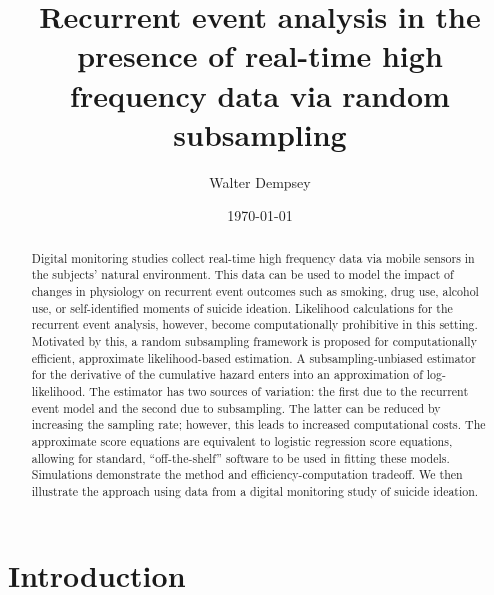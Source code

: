 \documentclass[11pt]{amsart}
\begin{document}
\title{Recurrent event analysis in the presence of real-time high
  frequency data via random subsampling}
\author{Walter Dempsey}
\address {Department of Statistics, 
  Harvard University, One Oxford Street
   Cambridge, MA  02138, USA}

\date{\today}

\begin{abstract}
Digital monitoring studies collect real-time high frequency data via
mobile sensors in the subjects' natural environment.  
This data can be used to model the impact of changes in physiology on
recurrent event outcomes such as smoking, drug use, alcohol use, or
self-identified moments of suicide ideation. 
Likelihood calculations for the recurrent event analysis, however,
become computationally prohibitive in this setting.  
Motivated by this, a random subsampling framework is proposed for
computationally efficient, approximate likelihood-based estimation.
A subsampling-unbiased estimator for the derivative of the cumulative
hazard enters into an approximation of log-likelihood. The estimator
has two sources of variation: the first due to the recurrent event
model and the second due to subsampling. The latter can be reduced by
increasing the sampling rate; however, this leads to increased
computational costs.  The approximate score equations are equivalent
to logistic regression score equations, allowing for standard,
``off-the-shelf'' software to be used in fitting these models.
Simulations demonstrate the method and efficiency-computation
tradeoff. We then illustrate the approach using data from a digital
monitoring study of suicide ideation.
\end{abstract}



\maketitle

\section{Introduction}
\end{document}
